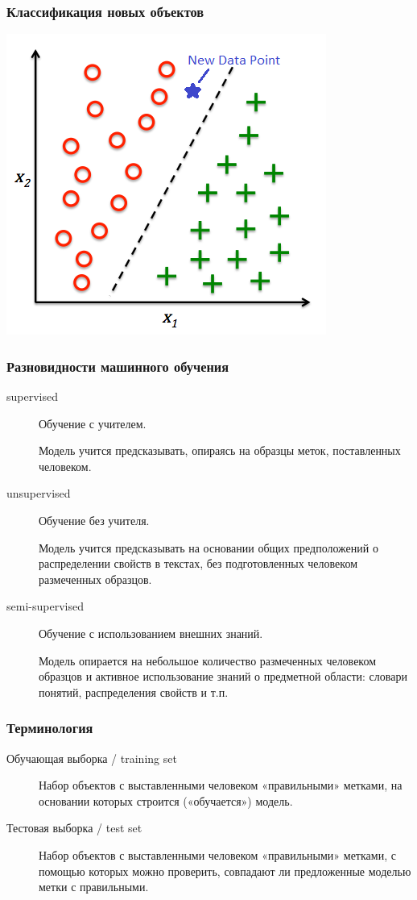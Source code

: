 \documentclass[svgnames]{beamer}
\begin{document}
\begin{frame}
  \frametitle{Классификация новых объектов}
  \centering
  \includegraphics[height=.8\textheight]{new-data-point}
\end{frame}

\begin{frame}
  \frametitle{Разновидности машинного обучения}  
  \begin{description}
  \item[supervised] Обучение с учителем. 

    Модель учится предсказывать, опираясь на образцы меток,
    поставленных человеком.

  \item[unsupervised] Обучение без учителя. 

    Модель учится предсказывать на основании общих предположений о
    распределении свойств в текстах, без подготовленных человеком
    размеченных образцов.

  \item[semi-supervised] Обучение с использованием внешних знаний.
    
    Модель опирается на \alert{небольшое} количество размеченных
    человеком образцов и активное использование знаний о
    предметной области: словари понятий, распределения свойств и т.п.
  \end{description}
\end{frame}

\begin{frame}
  \frametitle{Терминология}
  \begin{description}
  \item[Обучающая выборка / training set]

    Набор объектов с выставленными человеком «правильными» метками, на
    основании которых строится («обучается») модель.

  \item[Тестовая выборка / test set]

    Набор объектов с выставленными человеком «правильными» метками, с
    помощью которых можно проверить, совпадают ли предложенные моделью
    метки с правильными.
    
  \end{description}
\end{frame}
\end{document}
